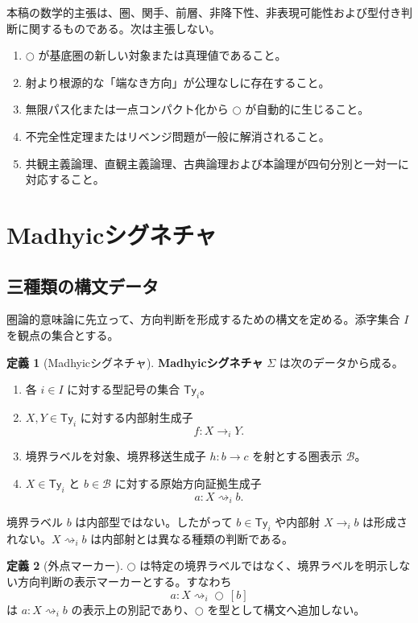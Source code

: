 \documentclass[a4paper,11pt]{ltjsarticle}
\theoremstyle{definition}
\newtheorem{definition}{定義}[section]
\theoremstyle{plain}
\newcommand{\Bdy}{\mathcal B}
\newcommand{\Ty}{\mathsf{Ty}}
\newcommand{\dfix}{\bigcirc}
\begin{document}
本稿の数学的主張は、圏、関手、前層、非降下性、非表現可能性および型付き判断に関するものである。次は主張しない。
\begin{enumerate}
 \item $\dfix$ が基底圏の新しい対象または真理値であること。
 \item 射より根源的な「端なき方向」が公理なしに存在すること。
 \item 無限パス化または一点コンパクト化から $\dfix$ が自動的に生じること。
 \item 不完全性定理またはリベンジ問題が一般に解消されること。
 \item 共観主義論理、直観主義論理、古典論理および本論理が四句分別と一対一に対応すること。
\end{enumerate}

\section{Madhyicシグネチャ}

\subsection{三種類の構文データ}

圏論的意味論に先立って、方向判断を形成するための構文を定める。添字集合 $I$ を観点の集合とする。

\begin{definition}[Madhyicシグネチャ]
\textbf{Madhyicシグネチャ} $\Sigma$ は次のデータから成る。
\begin{enumerate}
 \item 各 $i\in I$ に対する型記号の集合 $\Ty_i$。
 \item $X,Y\in\Ty_i$ に対する内部射生成子
 \[
  f:X\longrightarrow_i Y.
 \]
 \item 境界ラベルを対象、境界移送生成子 $h:b\to c$ を射とする圏表示 $\Bdy$。
 \item $X\in\Ty_i$ と $b\in\Bdy$ に対する原始方向証拠生成子
 \[
  a:X\rightsquigarrow_i b.
 \]
\end{enumerate}
\end{definition}

境界ラベル $b$ は内部型ではない。したがって $b\in\Ty_i$ や内部射 $X\to_i b$ は形成されない。$X\rightsquigarrow_i b$ は内部射とは異なる種類の判断である。

\begin{definition}[外点マーカー]
$\dfix$ は特定の境界ラベルではなく、境界ラベルを明示しない方向判断の表示マーカーとする。すなわち
\[
 a:X\rightsquigarrow_i\dfix\,[b]
\]
は $a:X\rightsquigarrow_i b$ の表示上の別記であり、$\dfix$ を型として構文へ追加しない。
\end{definition}
\end{document}
